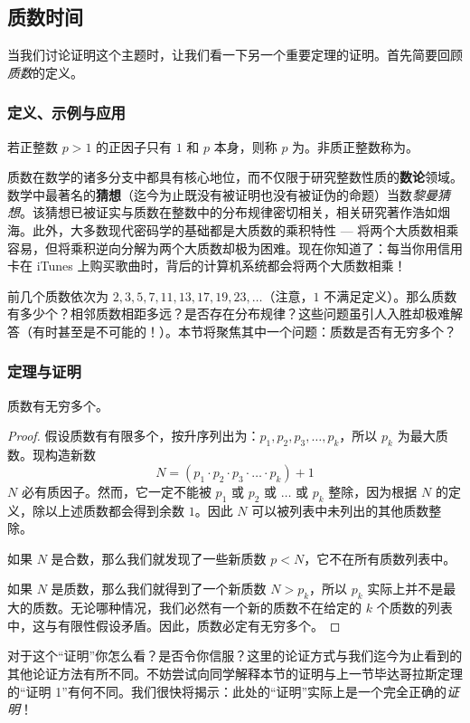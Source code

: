 \subsection{质数时间}\label{sec:section1.1.2}

当我们讨论证明这个主题时，让我们看一下另一个重要定理的证明。首先简要回顾\emph{质数}的定义。

\subsubsection*{定义、示例与应用}

\begin{definition}\label{def:prime}
    若正整数 $p>1$ 的正因子只有 $1$ 和 $p$ 本身，则称 $p$ 为。非质正整数称为。
\end{definition}

质数在数学的诸多分支中都具有核心地位，而不仅限于研究整数性质的\textbf{数论}领域。数学中最著名的\textbf{猜想}（迄今为止既没有被证明也没有被证伪的命题）当数\emph{黎曼猜想}。该猜想已被证实与质数在整数中的分布规律密切相关，相关研究著作浩如烟海。此外，大多数现代密码学的基础都是大质数的乘积特性 --- 将两个大质数相乘容易，但将乘积逆向分解为两个大质数却极为困难。现在你知道了：每当你用信用卡在 iTunes 上购买歌曲时，背后的计算机系统都会将两个大质数相乘！

前几个质数依次为 $2, 3, 5, 7, 11, 13, 17, 19, 23,\dots$（注意，$1$ 不满足定义）。那么质数有多少个？相邻质数相距多远？是否存在分布规律？这些问题虽引人入胜却极难解答（有时甚至是不可能的！）。本节将聚焦其中一个问题：质数是否有无穷多个？

\subsubsection*{定理与证明}

\begin{theorem}[质数无穷性]
    质数有无穷多个。
\end{theorem}

\begin{proof}
    假设质数有有限多个，按升序列出为：$p_1, p_2, p_3, \dots, p_k$，所以 $p_k$ 为最大质数。现构造新数
    \[N = (p_1 \cdot p_2 \cdot p_3 \cdot \dots \cdot p_k) + 1\]
    $N$ 必有质因子。然而，它一定不能被 $p_1$ 或 $p_2$ 或 $\dots$ 或 $p_k$ 整除，因为根据 $N$ 的定义，除以上述质数都会得到余数 $1$。因此 $N$ 可以被列表中未列出的其他质数整除。

    如果 $N$ 是合数，那么我们就发现了一些新质数 $p < N$，它不在所有质数列表中。
    
    如果 $N$ 是质数，那么我们就得到了一个新质数 $N > p_k$，所以 $p_k$ 实际上并不是最大的质数。无论哪种情况，我们必然有一个新的质数不在给定的 $k$ 个质数的列表中，这与有限性假设矛盾。因此，质数必定有无穷多个。
\end{proof}

对于这个``证明''你怎么看？是否令你信服？这里的论证方式与我们迄今为止看到的其他论证方法有所不同。不妨尝试向同学解释本节的证明与上一节毕达哥拉斯定理的``证明 1''有何不同。我们很快将揭示：此处的``证明''实际上是一个完全正确的\emph{证明}！
